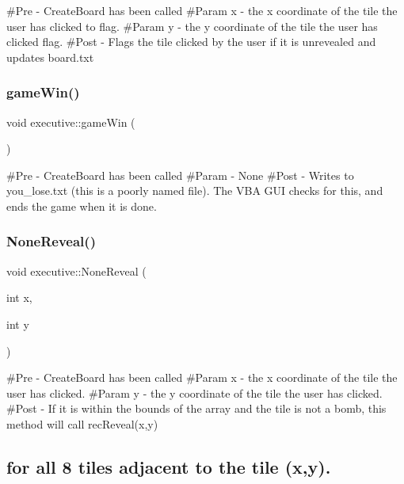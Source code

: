 \#\+Pre -\/ Create\+Board has been called \#\+Param x -\/ the x coordinate of the tile the user has clicked to flag. \#\+Param y -\/ the y coordinate of the tile the user has clicked flag. \#\+Post -\/ Flags the tile clicked by the user if it is unrevealed and updates board.\+txt \mbox{\label{classexecutive_adfb7dd27cc3b00120dc8500b3d54307b}} 
\subsubsection{\texorpdfstring{gameWin()}{gameWin()}}
{\footnotesize\ttfamily void executive\+::game\+Win (\begin{DoxyParamCaption}{ }\end{DoxyParamCaption})}

\#\+Pre -\/ Create\+Board has been called \#\+Param -\/ None \#\+Post -\/ Writes to you\+\_\+lose.\+txt (this is a poorly named file). The V\+BA G\+UI checks for this, and ends the game when it is done. \mbox{\label{classexecutive_aff9907584bb8cf4840af71a283182b50}} 
\subsubsection{\texorpdfstring{NoneReveal()}{NoneReveal()}}
{\footnotesize\ttfamily void executive\+::\+None\+Reveal (\begin{DoxyParamCaption}\item[{int}]{x,  }\item[{int}]{y }\end{DoxyParamCaption})}

\#\+Pre -\/ Create\+Board has been called \#\+Param x -\/ the x coordinate of the tile the user has clicked. \#\+Param y -\/ the y coordinate of the tile the user has clicked. \#\+Post -\/ If it is within the bounds of the array and the tile is not a bomb, this method will call rec\+Reveal(x,y) \subsection*{for all 8 tiles adjacent to the tile (x,y).}\mbox{\label{classexecutive_a8fecd4b8d669dc584d9e7b4ba43c0eb7}} 
